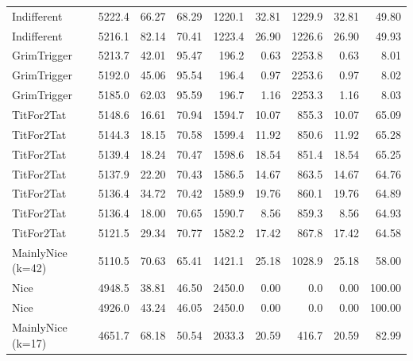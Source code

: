\documentclass[journal,a4paper,10pt,twoside]{IEEEtran} %
\begin{document}
\begin{table}[ht]
\begin{tabular}{l|rrr|rrrrr}
		Indifferent       & 5222.4 & 66.27 &     68.29 & 1220.1 &                  32.81 & 1229.9 &                   32.81 &  49.80 \\
		Indifferent       & 5216.1 & 82.14 &     70.41 & 1223.4 &                  26.90 & 1226.6 &                   26.90 &  49.93 \\
		GrimTrigger       & 5213.7 & 42.01 &     95.47 &  196.2 &                   0.63 & 2253.8 &                    0.63 &   8.01 \\
		GrimTrigger       & 5192.0 & 45.06 &     95.54 &  196.4 &                   0.97 & 2253.6 &                    0.97 &   8.02 \\
		GrimTrigger       & 5185.0 & 62.03 &     95.59 &  196.7 &                   1.16 & 2253.3 &                    1.16 &   8.03 \\
		TitFor2Tat        & 5148.6 & 16.61 &     70.94 & 1594.7 &                  10.07 &  855.3 &                   10.07 &  65.09 \\
		TitFor2Tat        & 5144.3 & 18.15 &     70.58 & 1599.4 &                  11.92 &  850.6 &                   11.92 &  65.28 \\
		TitFor2Tat        & 5139.4 & 18.24 &     70.47 & 1598.6 &                  18.54 &  851.4 &                   18.54 &  65.25 \\
		TitFor2Tat        & 5137.9 & 22.20 &     70.43 & 1586.5 &                  14.67 &  863.5 &                   14.67 &  64.76 \\
		TitFor2Tat        & 5136.4 & 34.72 &     70.42 & 1589.9 &                  19.76 &  860.1 &                   19.76 &  64.89 \\
		TitFor2Tat        & 5136.4 & 18.00 &     70.65 & 1590.7 &                   8.56 &  859.3 &                    8.56 &  64.93 \\
		TitFor2Tat        & 5121.5 & 29.34 &     70.77 & 1582.2 &                  17.42 &  867.8 &                   17.42 &  64.58 \\
		MainlyNice (k=42) & 5110.5 & 70.63 &     65.41 & 1421.1 &                  25.18 & 1028.9 &                   25.18 &  58.00 \\
		Nice              & 4948.5 & 38.81 &     46.50 & 2450.0 &                   0.00 &    0.0 &                    0.00 & 100.00 \\
		Nice              & 4926.0 & 43.24 &     46.05 & 2450.0 &                   0.00 &    0.0 &                    0.00 & 100.00 \\
		MainlyNice (k=17) & 4651.7 & 68.18 &     50.54 & 2033.3 &                  20.59 &  416.7 &                   20.59 &  82.99 \\

\end{tabular}
\end{table}
\end{document}
